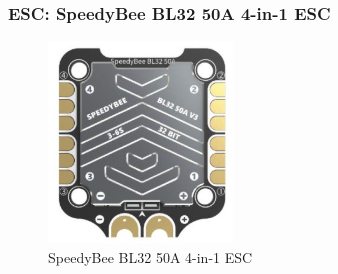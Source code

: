 \documentclass[12pt]{report}
\begin{document}
      \subsubsection{\large ESC: SpeedyBee BL32 50A 4-in-1 ESC} 
      \begin{figure}
        \includegraphics[width=1\linewidth]{esc.png}
        \caption{SpeedyBee BL32 50A 4-in-1 ESC}
        \label{fig:esc50a}
      \end{figure}
\end{document}
